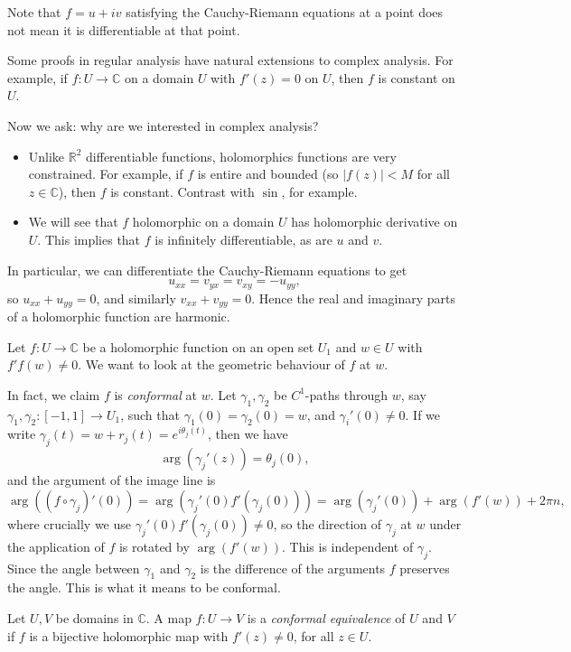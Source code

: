 \documentclass[12pt]{article}
\begin{document}
Note that $f = u + iv$ satisfying the Cauchy-Riemann equations at a point does not mean it is differentiable at that point.

Some proofs in regular analysis have natural extensions to complex analysis. For example, if $f : U \to \mathbb{C}$ on a domain $U$ with $f'(z) = 0$ on $U$, then $f$ is constant on $U$.

Now we ask: why are we interested in complex analysis?
\begin{itemize}
	\item Unlike $\mathbb{R}^2$ differentiable functions, holomorphics functions are very constrained. For example, if $f$ is entire and bounded (so $|f(z)| < M$ for all $z \in \mathbb{C}$), then $f$ is constant. Contrast with $\sin$, for example.
	\item We will see that $f$ holomorphic on a domain $U$ has holomorphic derivative on $U$. This implies that $f$ is infinitely differentiable, as are $u$ and $v$.
\end{itemize}
In particular, we can differentiate the Cauchy-Riemann equations to get
\[
u_{xx} = v_{yx} = v_{xy} = -u_{yy}
,\]
so $u_{xx} + u_{yy} = 0$, and similarly $v_{xx} + v_{yy} = 0$. Hence the real and imaginary parts of a holomorphic function are harmonic.

Let $f : U \to \mathbb{C}$ be a holomorphic function on an open set $U_1$ and $w \in U$ with $f'f(w) \neq 0$. We want to look at the geometric behaviour of $f$ at $w$.

In fact, we claim $f$ is \emph{conformal} at $w$. Let $\gamma_1, \gamma_2$ be $C^{1}$-paths through $w$, say $\gamma_1, \gamma_2 : [-1,1] \to U_1$, such that $\gamma_1(0) = \gamma_2(0) = w$, and $\gamma_i'(0) \neq 0$. If we write $\gamma_j(t) = w + r_j(t) = e^{i \theta_j(t)}$, then we have
\[
\arg(\gamma_j'(z)) = \theta_j(0)
,\]
and the argument of the image line is
\[
\arg((f \circ \gamma_j)'(0)) = \arg(\gamma_j'(0) f'(\gamma_j(0))) = \arg(\gamma_j'(0)) + \arg(f'(w)) + 2 \pi n
,\]
where crucially we use $\gamma_j'(0) f'(\gamma_j(0)) \neq 0$, so the direction of $\gamma_j$ at $w$ under the application of $f$ is rotated by $\arg(f'(w))$. This is independent of $\gamma_j$. Since the angle between $\gamma_1$ and $\gamma_2$ is the difference of the arguments $f$ preserves the angle. This is what it means to be conformal.

\begin{definition}
	Let $U, V$ be domains in $\mathbb{C}$. A map $f : U \to V$ is a \emph{conformal equivalence} of $U$ and $V$ if $f$ is a bijective holomorphic map with $f'(z) \neq 0$, for all $z \in U$.
\end{definition}
\end{document}
